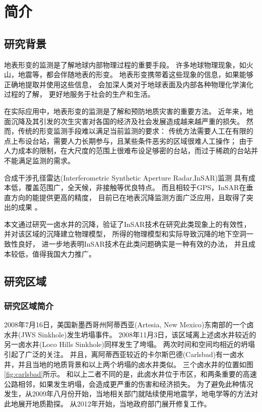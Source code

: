 
\chapter{简介}

\section{研究背景}

地表形变的监测是了解地球内部物理过程的重要手段。
许多地球物理现象，如火山，地震等，都会伴随地表的形变。
地表形变携带着这些现象的信息，如果能够正确地提取并使用这些信息，
会加深人类对于地球表面及内部各种物理化学演化过程的了解，
更好地服务于社会的生产和生活。

在实际应用中，地表形变的监测是了解和预防地质灾害的重要方法。
近年来，地面沉降及其引发的次生灾害对各国的经济及社会发展造成越来越严重的损失。
然而，传统的形变监测手段难以满足当前监测的要求：
传统方法需要人工在有限的点上布设台站，需要人力长期参与，且某些条件恶劣的区域很难人工操作；
由于人力成本的限制，在大尺度的范围上很难布设足够密的台站，而过于稀疏的台站并不能满足监测的需求。

合成干涉孔径雷达(Interferometric Synthetic Aperture Radar,InSAR)监测
具有成本低，覆盖范围广，全天候，非接触等优良特点。
而且相较于GPS，InSAR在垂直方向的能提供更高的精度，%
目前已在地表沉降监测方面广泛应用，且取得了突出的成果
\cite{kimEvolutionSinkholesWink2019a,shiSubsidenceSinkholesWink2019a}。

本文通过研究一卤水井的沉降，验证了InSAR技术在研究此类现象上的有效性，
并对该区域的沉降建立物理模型，
所得的物理模型和实际导致沉降的地下空洞一致性良好，
进一步地表明InSAR技术在此类问题确实是一种有效的办法，
并且成本较低，值得我国大力推广。

\section{研究区域}

\subsection{研究区域简介}
2008年7月16日，美国新墨西哥州阿蒂西亚(Artesia, New Mexico)东南部的一个卤水井(JWS Sinkhole)发生坍塌事件。
2008年11月3日，该区域离上述卤水井较近的另一卤水井(Loco Hills Sinkhole)同样发生了垮塌。
两次时间和空间均相近的坍塌引起了广泛的关注。
并且，离阿蒂西亚较近的卡尔斯巴德(Carlsbad)有一卤水井，并且当地的地质背景和以上两个坍塌的卤水井类似。
三个卤水井的位置如图\ref{fig:carlsbad}所示。
和以上二者不同的是，此卤水井位于市区，和两条重要的高速公路相邻，如果发生坍塌，会造成更严重的伤害和经济损失。
为了避免此种情况发生，从2009年八月份开始，当地相关部门就陆续使用地震学，地电学等的方法对此地展开地质勘探。
从2012年开始，当地政府部门展开修复工作。

